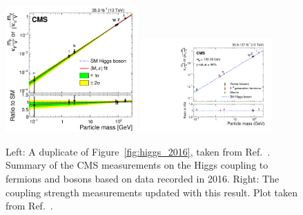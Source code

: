 \begin{figure}[!htb]
    \centering
    \captionsetup{justification=justified}
    \includegraphics[width=0.45\textwidth]{pics/Intro/higgs_coupling_2016.png}
    \includegraphics[width=0.45\textwidth]{pics/results/higgs_coupling_new.pdf}
    \caption{Left: A duplicate of Figure~\ref{fig:higgs_2016}, taken from Ref.~\cite{Sirunyan:2640611}. 
             Summary of the CMS measurements on the Higgs coupling to fermions and bosons based on data recorded in 2016.
             Right: The coupling strength measurements updated with this \hmm result. Plot taken from Ref.~\cite{Sirunyan_2021}.}
    \label{fig:higgs_coupling_new}
\end{figure}

